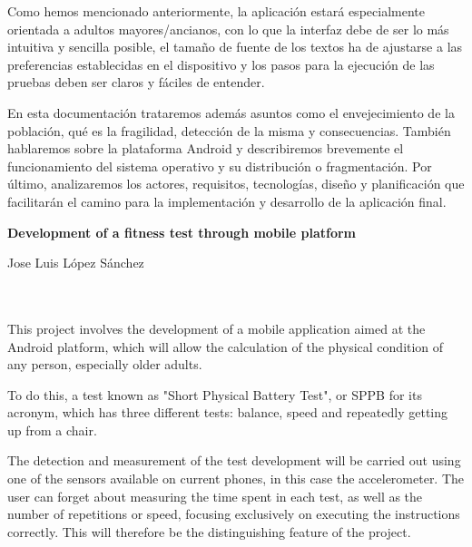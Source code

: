 Como hemos mencionado anteriormente, la aplicación estará especialmente orientada a adultos mayores/ancianos, con lo que la interfaz debe de ser lo más intuitiva y sencilla posible, el tamaño de fuente de los textos ha de ajustarse a las preferencias establecidas en el dispositivo y los pasos para la ejecución de las pruebas deben ser claros y fáciles de entender.

En esta documentación trataremos además asuntos como el envejecimiento de la población, qué es la fragilidad, detección de la misma y consecuencias. También hablaremos sobre la plataforma Android y describiremos brevemente el funcionamiento del sistema operativo y su distribución o fragmentación. Por último, analizaremos los actores, requisitos, tecnologías, diseño y planificación que facilitarán el camino para la implementación y desarrollo de la aplicación final.
\cleardoublepage


\thispagestyle{empty}


\begin{center}
{\large\bfseries Development of a fitness test through mobile platform}\\
\end{center}
\begin{center}
Jose Luis López Sánchez\\
\end{center}

\\

\vspace{0.7cm}
\\

This project involves the development of a mobile application aimed at the Android platform, which will allow the calculation of the physical condition of any person, especially older adults.

To do this, a test known as "Short Physical Battery Test", or SPPB for its acronym, which has three different tests: balance, speed and repeatedly getting up from a chair.

The detection and measurement of the test development will be carried out using one of the sensors available on current phones, in this case the accelerometer. The user can forget about measuring the time spent in each test, as well as the number of repetitions or speed, focusing exclusively on executing the instructions correctly. This will therefore be the distinguishing feature of the project.

